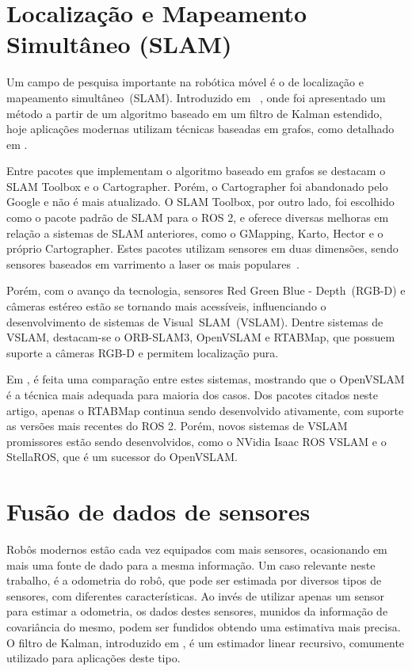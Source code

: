 \documentclass[repeatfields,xlists,xpacks,oneside,yearsonly]{ufrgscca}
\begin{document}
\section{Localização e Mapeamento Simultâneo (SLAM)}

Um campo de pesquisa importante na robótica móvel é o de localização
e mapeamento simultâneo~(SLAM). Introduzido em
~\textcite{slam_intro}, onde foi apresentado um método a partir de um
algoritmo baseado em um filtro de Kalman estendido, hoje aplicações
modernas utilizam técnicas baseadas em grafos, como detalhado em
\textcite{graph_slam}.

Entre pacotes que implementam o algoritmo baseado em grafos se
destacam o SLAM Toolbox e o Cartographer. Porém, o Cartographer foi
abandonado pelo Google e não é mais atualizado. O SLAM Toolbox, por
outro lado, foi escolhido como o pacote padrão de SLAM para o ROS 2,
e oferece diversas melhoras em relação a sistemas de SLAM anteriores,
como o GMapping, Karto, Hector e o próprio Cartographer. Estes
pacotes utilizam sensores em duas dimensões, sendo sensores baseados
em varrimento a laser os mais populares~\cite{SensorAndSLAM}.

Porém, com o avanço da tecnologia, sensores Red Green Blue -
Depth~(RGB-D) e câmeras estéreo estão se tornando mais acessíveis,
influenciando o desenvolvimento de sistemas de Visual~SLAM~(VSLAM).
Dentre sistemas de VSLAM, destacam-se o ORB-SLAM3, OpenVSLAM e
RTABMap, que possuem suporte a câmeras RGB-D e permitem localização
pura.

Em \textcite{VSLAM}, é feita uma comparação entre estes sistemas,
mostrando que o OpenVSLAM é a técnica mais adequada para maioria dos
casos. Dos pacotes citados neste artigo, apenas o RTABMap continua
sendo desenvolvido ativamente, com suporte as versões mais recentes
do ROS 2. Porém, novos sistemas de VSLAM promissores estão sendo
desenvolvidos, como o NVidia Isaac ROS VSLAM e o StellaROS, que é um
sucessor do OpenVSLAM.

\section{Fusão de dados de sensores}

Robôs modernos estão cada vez equipados com mais sensores,
ocasionando em mais uma fonte de dado para a mesma informação. Um
caso relevante neste trabalho, é a odometria do robô, que pode ser
estimada por diversos tipos de sensores, com diferentes
características. Ao invés de utilizar apenas um sensor para estimar a
odometria, os dados destes sensores, munidos da informação de
covariância do mesmo, podem ser fundidos obtendo uma estimativa mais
precisa. O filtro de Kalman, introduzido em \textcite{KalmanFilter},
é um estimador linear recursivo, comumente utilizado para aplicações
deste tipo.
\end{document}

